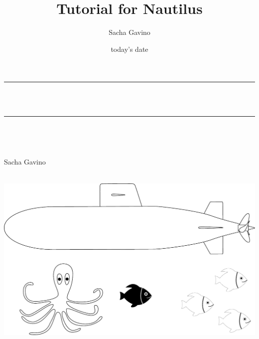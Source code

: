 \documentclass[12pt]{report}
\title{Tutorial for Nautilus}
\author{ Sacha Gavino}
\date{today's date}
\makeatletter
\let\thetitle\@title
\makeatother
\begin{document}

\begin{titlepage}
	\centering
    \vspace*{0.5 cm}


	\rule{\linewidth}{0.2 mm} \\[0.4 cm]
	{ \huge \bfseries \thetitle}\\
	\rule{\linewidth}{0.2 mm} \\[1.5 cm]
	
	\begin{minipage}{0.4\textwidth}
		\begin{flushleft} \large
			\end{flushleft}
			\end{minipage}~
			\begin{minipage}{0.4\textwidth}
            
			\begin{flushright} \large

			Sacha Gavino 

		\end{flushright}
           
	\end{minipage}\\[2 cm]
	
	\includegraphics[scale = 0.5]{../nautilus_logo.pdf}
    
    
    
    
	
\end{titlepage}
\end{document}
